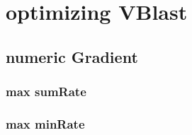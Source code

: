 \section{optimizing VBlast}

\subsection{numeric Gradient}
\subsubsection{max sumRate}
\subsubsection{max minRate}

